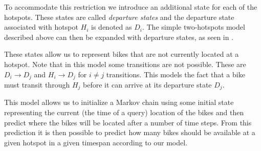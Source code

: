 To accommodate this restriction we introduce an additional state for each of the hotspots.
These states are called \emph{departure states} and the departure state associated with hotspot $H_i$ is denoted as $D_i$.
The simple two-hotspots model described above can then be expanded with departure states, as seen in .



These states allow us to represent bikes that are not currently located at a hotspot.
Note that in this model some transitions are not possible.
These are $D_i \rightarrow D_j$ and $H_i \rightarrow D_j $ for $i \neq j$ transitions.
This models the fact that a bike must transit through $H_j$ before it can arrive at its departure state $D_j$.

This model allows us to initialize a Markov chain using some initial state representing the current (the time of a query) location of the bikes and then predict where the bikes will be located after a number of time steps.
From this prediction it is then possible to predict how many bikes should be available at a given hotspot in a given timespan according to our model.
